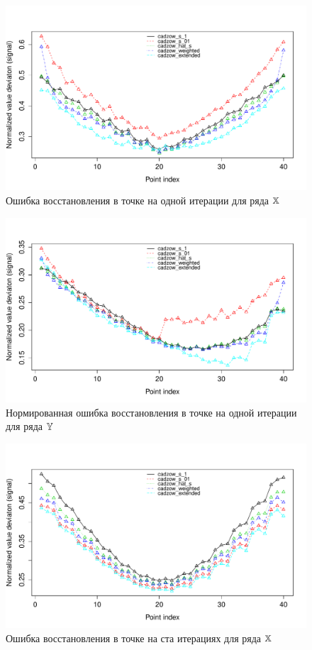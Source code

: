 \documentclass[12pt,a4paper,fleqn,leqno]{article}
\begin{document}
\begin{figure}[!h] \begin{center}
\includegraphics[width = 15cm]{s1_it1.pdf}\caption{Ошибка восстановления в точке на одной итерации для ряда $\mathbb{X}$}
\end{center}\end{figure}
\begin{figure}[!h] \begin{center}
\includegraphics[width = 15cm]{s2_it1.pdf}\caption{Нормированная ошибка восстановления в точке на одной итерации для ряда $\mathbb{Y}$}
\end{center}\end{figure}
\begin{figure}[!h] \begin{center}
\includegraphics[width = 15cm]{s1_it100.pdf}\caption{Ошибка восстановления в точке на ста итерациях для ряда $\mathbb{X}$}
\end{center}\end{figure}
\end{document}
